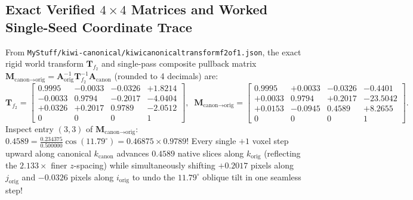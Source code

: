 \documentclass[10pt,a4paper]{article}
\renewcommand{\_}{\origunderscore\allowbreak}
\begin{document}
\subsection{Exact Verified $4\times 4$ Matrices and Worked Single-Seed Coordinate Trace}

From \texttt{MyStuff/kiwi-canonical/kiwi\_canonical\_transform\_f2\_o\_f1.json}, the exact rigid world transform $\mathbf{T}_{f_2}$ and single-pass composite pullback matrix $\mathbf{M}_{\text{canon}\to\text{orig}} = \mathbf{A}_{\text{orig}}^{-1}\mathbf{T}_{f_2}^{-1}\mathbf{A}_{\text{canon}}$ (rounded to 4 decimals) are:
{\small\setlength{\arraycolsep}{3.4pt}
\begin{equation}
    \mathbf{T}_{f_2} =
    \begin{bmatrix}
         0.9995 & -0.0033 & -0.0326 & +1.8214 \\
        -0.0033 &  0.9794 & -0.2017 & -4.0404 \\
        +0.0326 & +0.2017 &  0.9789 & -2.0512 \\
         0 & 0 & 0 & 1
    \end{bmatrix},
    \;\;
    \mathbf{M}_{\text{canon}\to\text{orig}} =
    \begin{bmatrix}
         0.9995 & +0.0033 & -0.0326 & -0.4401 \\
        +0.0033 &  0.9794 & +0.2017 & -23.5042 \\
        +0.0153 & -0.0945 &  0.4589 & +8.2655 \\
         0 & 0 & 0 & 1
    \end{bmatrix}.
    \label{eq:exact_matrices}
\end{equation}
}
Inspect entry $(3,3)$ of $\mathbf{M}_{\text{canon}\to\text{orig}}$: $0.4589 = \frac{0.234375}{0.500000}\cos(11.79^\circ) = 0.46875 \times 0.9789$! Every single $+1$ voxel step upward along canonical $k_{\text{canon}}$ advances $0.4589$ native slices along $k_{\text{orig}}$ (reflecting the $2.133\times$ finer $z$-spacing) while simultaneously shifting $+0.2017$ pixels along $j_{\text{orig}}$ and $-0.0326$ pixels along $i_{\text{orig}}$ to undo the $11.79^\circ$ oblique tilt in one seamless step!
\end{document}
